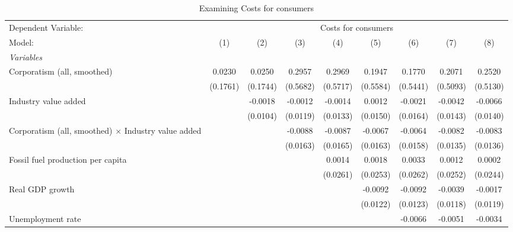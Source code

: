 
\begin{table}[htbp]
   \caption{Examining Costs for consumers}
   \centering
   \begin{tabular}{lcccccccc}
      \tabularnewline \midrule \midrule
      Dependent Variable: & \multicolumn{8}{c}{Costs for consumers}\\
      Model:                                                     & (1)      & (2)      & (3)      & (4)      & (5)      & (6)      & (7)      & (8)\\  
      \midrule
      \emph{Variables}\\
      Corporatism (all, smoothed)                                & 0.0230   & 0.0250   & 0.2957   & 0.2969   & 0.1947   & 0.1770   & 0.2071   & 0.2520\\   
                                                                 & (0.1761) & (0.1744) & (0.5682) & (0.5717) & (0.5584) & (0.5441) & (0.5093) & (0.5130)\\   
      Industry value added                                       &          & -0.0018  & -0.0012  & -0.0014  & 0.0012   & -0.0021  & -0.0042  & -0.0066\\   
                                                                 &          & (0.0104) & (0.0119) & (0.0133) & (0.0150) & (0.0164) & (0.0143) & (0.0140)\\   
      Corporatism (all, smoothed) $\times$ Industry value added  &          &          & -0.0088  & -0.0087  & -0.0067  & -0.0064  & -0.0082  & -0.0083\\   
                                                                 &          &          & (0.0163) & (0.0165) & (0.0163) & (0.0158) & (0.0135) & (0.0136)\\   
      Fossil fuel production per capita                          &          &          &          & 0.0014   & 0.0018   & 0.0033   & 0.0012   & 0.0002\\   
                                                                 &          &          &          & (0.0261) & (0.0253) & (0.0262) & (0.0252) & (0.0244)\\   
      Real GDP growth                                            &          &          &          &          & -0.0092  & -0.0092  & -0.0039  & -0.0017\\   
                                                                 &          &          &          &          & (0.0122) & (0.0123) & (0.0118) & (0.0119)\\   
      Unemployment rate                                          &          &          &          &          &          & -0.0066  & -0.0051  & -0.0034\\   

\end{tabular}
\end{table}
